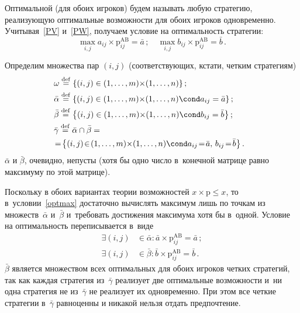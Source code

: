 \documentclass[twoside]{article}
\begin{document}
Оптимальной (для обоих игроков) будем называть любую стратегию, реализующую оптимальные возможности
для обоих игроков одновременно. Учитывая~\eqref{PV} и~\eqref{PW}, получаем условие на оптимальность
стратегии:
    \begin{equation}\label{optmax}
\max_{i,j}a_{ij}\times\mathrm{p}^\mathrm{AB}_{ij}=\bar a\,;
    \quad
\max_{i,j}b_{ij}\times\mathrm{p}^\mathrm{AB}_{ij}=\bar b\,.
    \end{equation}

Определим множества пар $(i,j)$ (со\-от\-ветс\-тву\-ющих, кстати,
четким стратегиям)
    \begin{equation}\label{opi}
    \hspace*{-7pt}
    \begin{aligned}
&\omega\stackrel{\mathrm{def}}{=}\left\{(i,j)\in(1,\dots,m){\times}(1,\dots,n)%
\right\};
    \\
&\bar\alpha\stackrel{\mathrm{def}}{=}\left\{(i,j)\in(1,\dots,m){\times}(1,\dots,n)\cond
a_{ij}=\bar a\right\};
    \\
&\bar\beta\stackrel{\mathrm{def}}{=}\left\{(i,j)\in(1,\dots,m){\times}(1,\dots,n)\cond
b_{ij}=\bar b\right\};
    \\
&\bar\gamma\stackrel{\mathrm{def}}{=}\bar\alpha\cap\bar\beta={}
    \\
&\!=\!\left\{(i,j)\!\in\!(1,\dots,m){\times}(1,\dots,n)\cond
a_{ij}\!=\!\bar a,\, b_{ij}\!=\!\bar b\right\}.
    \end{aligned}
    \end{equation}
$\bar\alpha$ и $\bar\beta$, очевидно, непусты (хотя бы одно число
в~конечной матрице равно максимуму по этой \mbox{матрице}).

Поскольку в обоих вариантах теории воз\-мож\-ностей
$x{\times}\mathrm{p}\le x$, то в~условии~\eqref{optmax} достаточно
вычислять максимум лишь по точкам из множеств~$\bar\alpha$
и~$\bar\beta$ и~требовать достижения максимума хотя бы в~одной.
Условие на оптимальность переписывается в~виде
    \begin{equation}\label{expoptmax}
    \begin{aligned}
\exists(i,j)&\in\bar\alpha\colon\bar
a{\times}\mathrm{p}^\mathrm{AB}_{ij}=\bar a\,;
    \\
\exists(i,j)&\in\bar\beta\colon\bar
b{\times}\mathrm{p}^\mathrm{AB}_{ij}=\bar b\,.
    \end{aligned}
    \end{equation}
$\bar\beta$ является множеством всех оптимальных для обоих игроков четких стратегий, так как каждая
стратегия из~$\bar\gamma$ реализует две оптимальные воз\-мож\-ности и~ни одна стратегия не
из~$\bar\gamma$ не реализует их одновременно. При этом все четкие стратегии в~$\bar\gamma$
равноценны и никакой нельзя отдать пред\-поч\-те\-ние.
\end{document}
